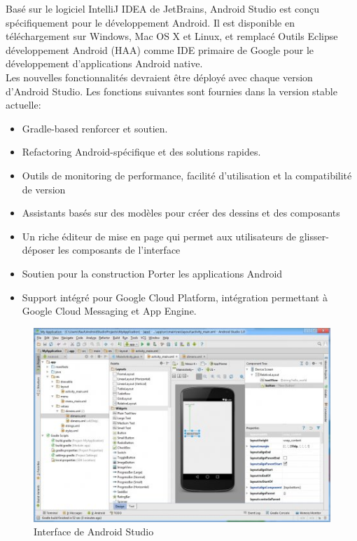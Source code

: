 \documentclass[11pt, a4paper, twoside]{book}
\begin{document}
Basé sur le logiciel IntelliJ IDEA de JetBrains, Android Studio est conçu spécifiquement pour le développement Android. Il est disponible en téléchargement sur Windows, Mac OS X et Linux, et remplacé Outils Eclipse développement Android (HAA) comme IDE primaire de Google pour le développement d'applications Android native.\\


Les nouvelles fonctionnalités devraient être déployé avec chaque version d'Android Studio. Les fonctions suivantes sont fournies dans la version stable actuelle: 
\begin{itemize}
\item Gradle-based  renforcer et soutien.
\item Refactoring Android-spécifique et des solutions rapides.
\item Outils de monitoring de performance, facilité d'utilisation et la compatibilité de version 
\item Assistants basés sur des modèles pour créer des dessins et des composants 
\item Un riche éditeur de mise en page qui permet aux utilisateurs de glisser-déposer les composants de l'interface
\item Soutien pour la construction Porter les applications Android
\item Support intégré pour Google Cloud Platform, intégration permettant à Google Cloud Messaging et App Engine.
\end{itemize}
\begin{figure}[H]
\centering
\includegraphics[width=\textwidth]{as}
\caption{Interface de Android Studio}
\end{figure}
\end{document}
